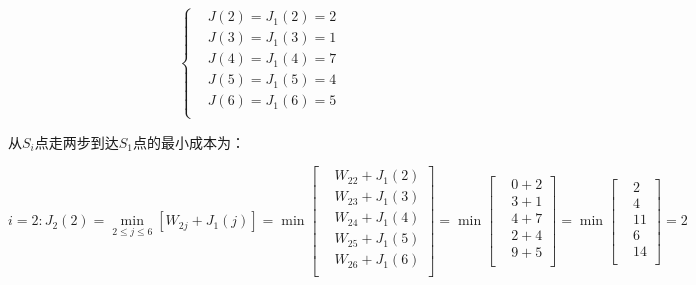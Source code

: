 \documentclass[UTF8]{ctexart}
\begin{document}
\begin{equation*}
    \left\{
    \begin{aligned}
        &J(2)=J_1(2)=2 \\
        &J(3)=J_1(3)=1 \\
        &J(4)=J_1(4)=7 \\
        &J(5)=J_1(5)=4 \\
        &J(6)=J_1(6)=5 \\
    \end{aligned}
    \right.
\end{equation*}

从$S_i$点走两步到达$S_1$点的最小成本为：

\begin{equation*}
    i=2:
    J_2(2)=\min_{2\leq j\leq6}[W_{2j}+J_1(j)]=\min
    \left[
    \begin{aligned}
        &W_{22}+J_1(2) \\
        &W_{23}+J_1(3) \\
        &W_{24}+J_1(4) \\
        &W_{25}+J_1(5) \\
        &W_{26}+J_1(6) \\
    \end{aligned}
    \right]
    =\min
    \left[
    \begin{aligned}
        &0+2 \\
        &3+1 \\
        &4+7 \\
        &2+4 \\
        &9+5 \\
    \end{aligned}
    \right]
    =\min
    \left[
    \begin{aligned}
        &2 \\
        &4 \\
        &11 \\
        &6 \\
        &14 \\
    \end{aligned}
    \right]
    =2
\end{equation*}
\end{document}
